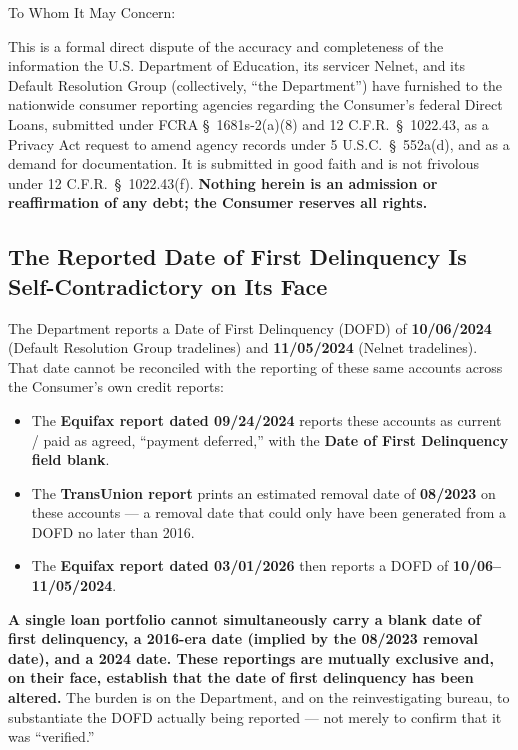 \documentclass[12pt,letterpaper]{article}
\begin{document}
To Whom It May Concern:

This is a formal direct dispute of the accuracy and completeness of the information the U.S. Department of Education, its servicer Nelnet, and its Default Resolution Group (collectively, ``the Department'') have furnished to the nationwide consumer reporting agencies regarding the Consumer's federal Direct Loans, submitted under FCRA \S~1681s-2(a)(8) and 12 C.F.R.\ \S~1022.43, as a Privacy Act request to amend agency records under 5 U.S.C.\ \S~552a(d), and as a demand for documentation. It is submitted in good faith and is not frivolous under 12 C.F.R.\ \S~1022.43(f). \textbf{Nothing herein is an admission or reaffirmation of any debt; the Consumer reserves all rights.}

\subsection*{The Reported Date of First Delinquency Is Self-Contradictory on Its Face}

The Department reports a Date of First Delinquency (DOFD) of \textbf{10/06/2024} (Default Resolution Group tradelines) and \textbf{11/05/2024} (Nelnet tradelines). That date cannot be reconciled with the reporting of these same accounts across the Consumer's own credit reports:

\begin{itemize}[noitemsep]
  \item The \textbf{Equifax report dated 09/24/2024} reports these accounts as current / paid as agreed, ``payment deferred,'' with the \textbf{Date of First Delinquency field blank}.
  \item The \textbf{TransUnion report} prints an estimated removal date of \textbf{08/2023} on these accounts --- a removal date that could only have been generated from a DOFD no later than 2016.
  \item The \textbf{Equifax report dated 03/01/2026} then reports a DOFD of \textbf{10/06--11/05/2024}.
\end{itemize}

\textbf{A single loan portfolio cannot simultaneously carry a blank date of first delinquency, a 2016-era date (implied by the 08/2023 removal date), and a 2024 date. These reportings are mutually exclusive and, on their face, establish that the date of first delinquency has been altered.} The burden is on the Department, and on the reinvestigating bureau, to substantiate the DOFD actually being reported --- not merely to confirm that it was ``verified.''
\end{document}
